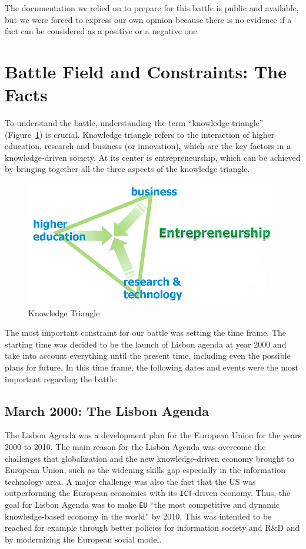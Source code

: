 \documentclass[11pt,a4paper,oneside,twocolumn]{IEEEtran}
\begin{document}
The documentation we relied on to prepare for this battle is public and available, but we were forced to express our own opinion because there is no evidence if a fact can be considered as a positive or a negative one.

\section{Battle Field and Constraints: The Facts}
To understand the battle, understanding the term ``knowledge triangle'' (Figure~\ref{fig:kt}) is crucial. Knowledge triangle refers to the interaction of higher education, research and business (or innovation), which are the key factors in a knowledge-driven society. At its center is entrepreneurship, which can be achieved by bringing together all the three aspects of the knowledge triangle.

\begin{figure}[!h]
    \centering
    \includegraphics[width=0.8\linewidth]{picture/Knowledge_Triangle.png}
    \caption{Knowledge Triangle}\label{fig:kt}
\end{figure}

The most important constraint for our battle was setting the time frame. The starting time was decided to be the launch of Lisbon agenda at year 2000 and take into account everything until the present time, including even the possible plans for future. In this time frame, the following dates and events were the most important regarding the battle:

\subsection{March 2000: The Lisbon Agenda}
The Lisbon Agenda was a development plan for the European Union for the years 2000 to 2010. The main reason for the Lisbon Agenda was overcome the challenges that globalization and the new knowledge-driven economy brought to European Union, such as the widening skills gap especially in the information technology area\cite{3_1}. A major challenge was also the fact that the US was outperforming the European economics with its \texttt{ICT}-driven economy\cite{3_1}. Thus, the goal for Lisbon Agenda was to make \texttt{EU} ``the most competitive and dynamic knowledge-based economy in the world'' by 2010\cite{3_1}. This was intended to be reached for example through better policies for information society and R\&D and by modernizing the European social model\cite{3_1}.
\end{document}
